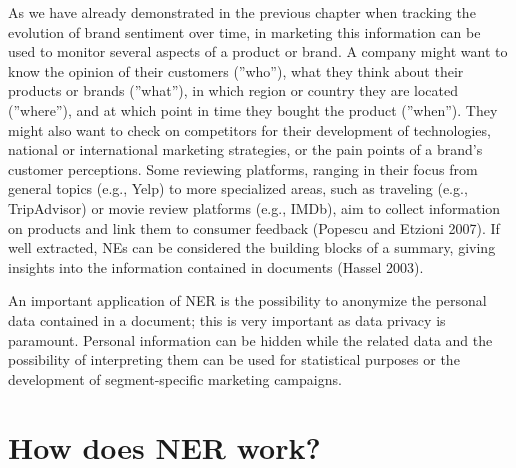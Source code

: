 As we have already demonstrated in the previous chapter when tracking the
evolution of brand sentiment over time, in marketing this information
can be used to monitor several aspects of a product or brand. A company might want to know the
opinion of their customers (''who''), what they think about their products or
brands (''what''), in which region or country they are located (''where''), and at which point in
time they bought the product (''when''). They might also want to check on competitors for their development of technologies, national or international marketing strategies, or the pain
points of a brand's customer perceptions. Some reviewing platforms,
ranging in their focus from general topics (e.g., Yelp) to more
specialized areas, such as traveling (e.g., TripAdvisor) or movie review
platforms (e.g., IMDb), aim to collect information on products and link
them to consumer feedback (Popescu and Etzioni 2007). If well
extracted, NEs can be considered the building blocks of a summary,
giving insights into the information contained in documents (Hassel
2003).

An important application of NER is the possibility to anonymize the
personal data contained in a document; this is very important as data privacy is paramount. Personal information can be
hidden while the related data and the possibility of interpreting them can
be used for statistical purposes or the development of segment-specific
marketing campaigns.

\section{How does NER work?}\label{how-does-ner-work}

